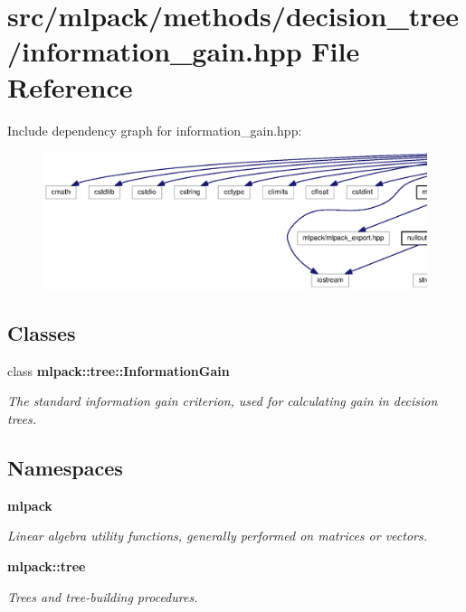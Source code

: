\section{src/mlpack/methods/decision\+\_\+tree/information\+\_\+gain.hpp File Reference}
\label{decision__tree_2information__gain_8hpp}
Include dependency graph for information\+\_\+gain.\+hpp\+:
\nopagebreak
\begin{figure}[H]
\begin{center}
\leavevmode
\includegraphics[width=350pt]{decision__tree_2information__gain_8hpp__incl}
\end{center}
\end{figure}
\subsection*{Classes}
\begin{DoxyCompactItemize}
\item 
class {\bf mlpack\+::tree\+::\+Information\+Gain}
\begin{DoxyCompactList}\small\item\em The standard information gain criterion, used for calculating gain in decision trees. \end{DoxyCompactList}\end{DoxyCompactItemize}
\subsection*{Namespaces}
\begin{DoxyCompactItemize}
\item 
 {\bf mlpack}
\begin{DoxyCompactList}\small\item\em Linear algebra utility functions, generally performed on matrices or vectors. \end{DoxyCompactList}\item 
 {\bf mlpack\+::tree}
\begin{DoxyCompactList}\small\item\em Trees and tree-\/building procedures. \end{DoxyCompactList}\end{DoxyCompactItemize}
